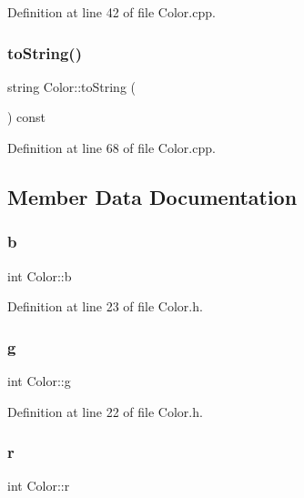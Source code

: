 Definition at line 42 of file Color.\+cpp.

\mbox{\label{struct_color_adcd722253e9d2bc4b7efd30d4f1c3eca}} 
\subsubsection{\texorpdfstring{to\+String()}{toString()}}
{\footnotesize\ttfamily string Color\+::to\+String (\begin{DoxyParamCaption}{ }\end{DoxyParamCaption}) const}



Definition at line 68 of file Color.\+cpp.



\subsection{Member Data Documentation}
\mbox{\label{struct_color_ae11f00d34bf3ecd8c8278f68876b82bf}} 
\subsubsection{\texorpdfstring{b}{b}}
{\footnotesize\ttfamily int Color\+::b}



Definition at line 23 of file Color.\+h.

\mbox{\label{struct_color_ab5656e995bddd43d286c7ff5629a31dd}} 
\subsubsection{\texorpdfstring{g}{g}}
{\footnotesize\ttfamily int Color\+::g}



Definition at line 22 of file Color.\+h.

\mbox{\label{struct_color_a4954bdc9772da2a610401b8a438125cb}} 
\subsubsection{\texorpdfstring{r}{r}}
{\footnotesize\ttfamily int Color\+::r}



